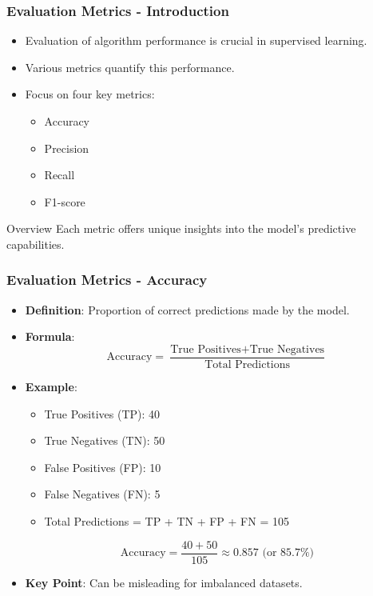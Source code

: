 \documentclass[aspectratio=169]{beamer}
\begin{document}
\begin{frame}[fragile]
    \frametitle{Evaluation Metrics - Introduction}
    \begin{itemize}
        \item Evaluation of algorithm performance is crucial in supervised learning.
        \item Various metrics quantify this performance.
        \item Focus on four key metrics:
        \begin{itemize}
            \item Accuracy
            \item Precision
            \item Recall
            \item F1-score
        \end{itemize}
    \end{itemize}
    \begin{block}{Overview}
        Each metric offers unique insights into the model's predictive capabilities.
    \end{block}
\end{frame}

\begin{frame}[fragile]
    \frametitle{Evaluation Metrics - Accuracy}
    \begin{itemize}
        \item \textbf{Definition}: Proportion of correct predictions made by the model.
        \item \textbf{Formula}:  
        \[
        \text{Accuracy} = \frac{\text{True Positives} + \text{True Negatives}}{\text{Total Predictions}}
        \]
        \item \textbf{Example}:
        \begin{itemize}
            \item True Positives (TP): 40
            \item True Negatives (TN): 50
            \item False Positives (FP): 10
            \item False Negatives (FN): 5
            \item Total Predictions = TP + TN + FP + FN = 105
        \end{itemize}
        \[
        \text{Accuracy} = \frac{40 + 50}{105} \approx 0.857 \text{ (or 85.7\%)}
        \]
        \item \textbf{Key Point}: Can be misleading for imbalanced datasets.
    \end{itemize}
\end{frame}
\end{document}
